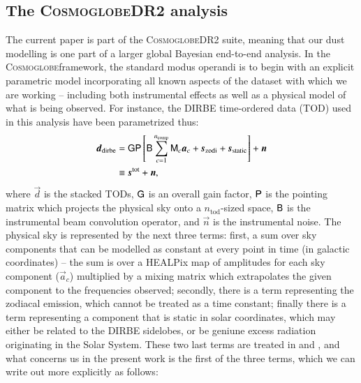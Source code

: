 \documentclass{aa}
\newcommand{\dv}[0]{\vec{d}}
\newcommand{\s}[0]{\vec{s}}
\newcommand{\M}[0]{\tens{M}}
\renewcommand{\P}[0]{\tens{P}}
\newcommand{\G}[0]{\tens{G}}
\newcommand{\B}[0]{\tens{B}}
\renewcommand{\a}[0]{\vec{a}}
\newcommand{\n}[0]{\vec{n}}
\def\Cosmoglobe{\textsc{Cosmoglobe}}
\begin{document}
\subsection{The \Cosmoglobe DR2 analysis}
The current paper is part of the \Cosmoglobe DR2 suite, meaning that our dust
modelling is one part of a larger global Bayesian end-to-end analysis. In the
\Cosmoglobe framework, the standard modus operandi is to begin with an explicit
parametric model incorporating all known aspects of the dataset with which we
are working -- including both instrumental effects as well as a physical model
of what is being observed. For instance, the DIRBE time-ordered data (TOD) used
in this analysis have been parametrized thus:
\begin{align}
	\label{eq:model}
    \dv_{\mathrm{dirbe}} &=\G\P\left[\B\sum_{c=1}^{n_{\mathrm{comp}}}\M_c\a_c+\s_{\mathrm{zodi}} +
          \s_{\mathrm{static}}\right] + \n \\
                         & \equiv \s^{\mathrm{tot}} + \n \nonumber,
\end{align}
where $\dv$ is the stacked TODs, $\G$ is an overall gain factor, $\P$ is the
pointing matrix which projects the physical sky onto a $n_{\mathrm{tod}}$-sized
space, $\B$ is the instrumental beam convolution operator, and $\n$ is the
instrumental noise. The physical sky is represented by the next three terms:
first, a sum over sky components that can be modelled as constant at every
point in time (in galactic coordinates) -- the sum is over a HEALPix map of
amplitudes for each sky component ($\a_c$) multiplied by a mixing matrix which
extrapolates the given component to the frequencies observed; secondly, there
is a term representing the zodiacal emission, which cannot be treated as a time
constant; finally there is a term representing a component that is static in
solar coordinates, which may either be related to the DIRBE sidelobes, or be
geniune excess radiation originating in the Solar System. These two last terms
are treated in \citet{CG02_02} and \citet{CG02_03}, and what concerns us in the
present work is the first of the three terms, which we can write out more
explicitly as follows:
\end{document}
